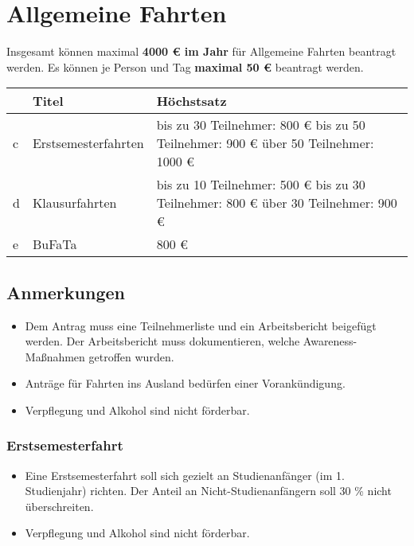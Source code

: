 \documentclass{article}
\begin{document}
\section{Allgemeine Fahrten}
    Insgesamt können maximal \textbf{4000 € im Jahr} für Allgemeine Fahrten beantragt werden. \newline
    Es können je Person und Tag \textbf{maximal 50 €} beantragt werden.\\
    
    \setlength\extrarowheight{2mm} \sffamily    
    \begin{tabular}{l||L{6cm}|L{7cm}}
    
    	&\textbf{Titel} &  \textbf{Höchstsatz}\\ \hline \hline
    	c &
    	Erstsemesterfahrten &
    	
    	bis zu 30 Teilnehmer: 800 € \newline
    	bis zu 50 Teilnehmer: 900 € \newline
    	über 50 Teilnehmer: 1000 €\\ \hline
    
    	d &
    	Klausurfahrten &
    	bis zu 10 Teilnehmer: 500 € \newline
    	bis zu 30 Teilnehmer: 800 € \newline
    	über 30 Teilnehmer: 900 €  \\ \hline
    	
    	e &
    	BuFaTa &
    	800 € \\
    \end{tabular}
    \rmfamily
    \subsection{Anmerkungen}
        \begin{itemize}
            \item Dem Antrag muss eine Teilnehmerliste und ein Arbeitsbericht beigefügt werden. Der Arbeitsbericht muss dokumentieren, welche Awareness-Maßnahmen getroffen wurden.
            \item Anträge für Fahrten ins Ausland bedürfen einer Vorankündigung.
            \item Verpflegung und Alkohol sind nicht förderbar.
        \end{itemize}
        \subsubsection{Erstsemesterfahrt}
            \begin{itemize}
                \item  Eine Erstsemesterfahrt soll sich gezielt an Studienanfänger (im 1. Studienjahr) richten. Der Anteil an Nicht-Studienanfängern soll 30 \% nicht überschreiten.
            \item Verpflegung und Alkohol sind nicht förderbar.
            \end{itemize}
\end{document}
